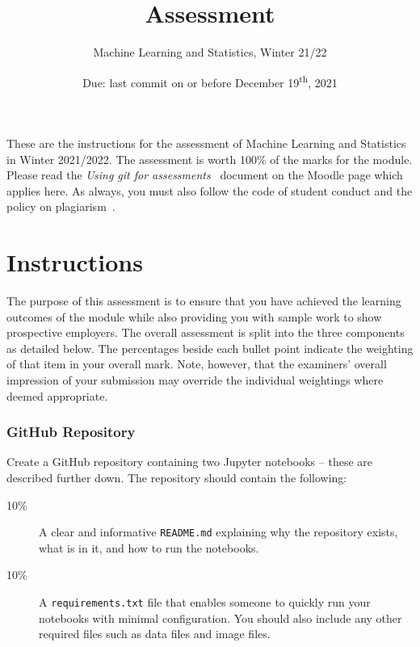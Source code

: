 \documentclass[a4paper, 12pt]{scrartcl}
\title{\vspace{-20mm}Assessment}
\author{Machine Learning and Statistics, Winter 21/22}
\date{Due: last commit on or before December 19\textsuperscript{th}, 2021\vspace{-6mm}}
\begin{document}
  
  \maketitle

  These are the instructions for the assessment of Machine Learning and Statistics in Winter 2021/2022.
  The assessment is worth 100\% of the marks for the module.
  Please read the \emph{Using git for assessments}~\cite{usinggit} document on the Moodle page which applies here.
  As always, you must also follow the code of student conduct and the policy on plagiarism~\cite{gmitqaf}. 

  \section*{Instructions}
  
  The purpose of this assessment is to ensure that you have achieved the learning outcomes of the module while also providing you with sample work to show prospective employers.
  The overall assessment is split into the three components as detailed below.
  The percentages beside each bullet point indicate the weighting of that item in your overall mark.
  Note, however, that the examiners' overall impression of your submission may override the individual weightings where deemed appropriate.
  
  \subsubsection*{GitHub Repository}
  Create a GitHub repository containing two Jupyter notebooks -- these are described further down.
  The repository should contain the following:
  \begin{description}
    \item[10\%] A clear and informative \texttt{README.md} explaining why the repository exists, what is in it, and how to run the notebooks.
    \item[10\%] A \texttt{requirements.txt} file that enables someone to quickly run your notebooks with minimal configuration. You should also include any other required files such as data files and image files.
  \end{description}
\end{document}

